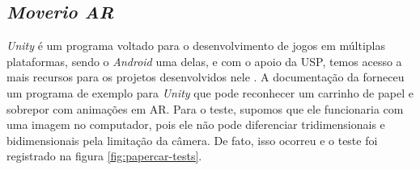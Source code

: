 


\subsection{\textit{Moverio AR}}\label{chp:moverio-unity}

\textit{Unity} é um programa voltado para o desenvolvimento de jogos em múltiplas plataformas, sendo o \textit{Android} uma delas, e com o apoio da USP, temos acesso a mais recursos para os projetos desenvolvidos nele \cite{UnityOficial}. A documentação da forneceu um programa de exemplo para \textit{Unity} que pode reconhecer um carrinho de papel e sobrepor com animações em AR. Para o teste, supomos que ele funcionaria com uma imagem no computador, pois ele não pode diferenciar tridimensionais e bidimensionais pela limitação da câmera. De fato, isso ocorreu e o teste foi registrado na figura \ref{fig:papercar-tests}.

